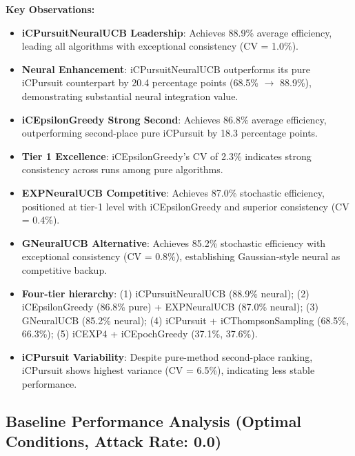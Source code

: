 \documentclass[12pt,a4paper]{article}
\newcommand{\primarytext}[1]{\textcolor{primaryblue}{\textbf{#1}}}
\newcommand{\secondarytext}[1]{\textcolor{secondaryblue}{\textbf{#1}}}
\newcommand{\warning}[1]{\textcolor{warningred}{\textbf{#1}}}
\newcommand{\legacy}[1]{\textcolor{legacycolor}{\textbf{#1}}}
\newcommand{\neural}[1]{\textcolor{neuralcolor}{\textbf{#1}}}
\begin{document}
\begin{tcolorbox}[colback=tableheader,colframe=primaryblue,title=\textbf{Primary iCMAB Performance Results (Stochastic Environment, Attack Rate: 0.25)}]
\textbf{Key Observations:}
\begin{itemize}
\item \neural{iCPursuitNeuralUCB Leadership}: Achieves 88.9\% average efficiency, leading all algorithms with exceptional consistency (CV = 1.0\%).
\item \neural{Neural Enhancement}: iCPursuitNeuralUCB outperforms its pure iCPursuit counterpart by 20.4 percentage points (68.5\% $\rightarrow$ 88.9\%), demonstrating substantial neural integration value.
\item \primarytext{iCEpsilonGreedy Strong Second}: Achieves 86.8\% average efficiency, outperforming second-place pure iCPursuit by 18.3 percentage points.
\item \primarytext{Tier 1 Excellence}: iCEpsilonGreedy's CV of 2.3\% indicates strong consistency across runs among pure algorithms.
\item \legacy{EXPNeuralUCB Competitive}: Achieves 87.0\% stochastic efficiency, positioned at tier-1 level with iCEpsilonGreedy and superior consistency (CV = 0.4\%).
\item \neural{GNeuralUCB Alternative}: Achieves 85.2\% stochastic efficiency with exceptional consistency (CV = 0.8\%), establishing Gaussian-style neural as competitive backup.
\item \secondarytext{Four-tier hierarchy}: (1) iCPursuitNeuralUCB (88.9\% neural); (2) iCEpsilonGreedy (86.8\% pure) + EXPNeuralUCB (87.0\% neural); (3) GNeuralUCB (85.2\% neural); (4) iCPursuit + iCThompsonSampling (68.5\%, 66.3\%); (5) iCEXP4 + iCEpochGreedy (37.1\%, 37.6\%).
\item \warning{iCPursuit Variability}: Despite pure-method second-place ranking, iCPursuit shows highest variance (CV = 6.5\%), indicating less stable performance.
\end{itemize}
\end{tcolorbox}

\subsection{Baseline Performance Analysis (Optimal Conditions, Attack Rate: 0.0)}
\end{document}
